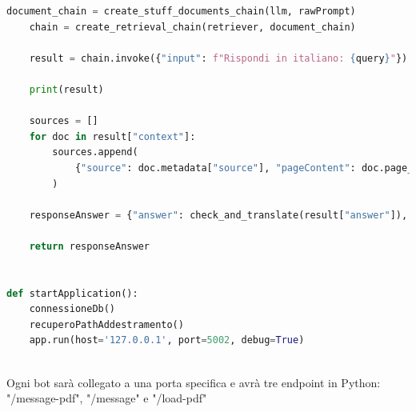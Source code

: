 \documentclass[a4paper,twoside,12pt]{toptesi}
\begin{document}
\begin{lstlisting}[language=Python, caption=Python example]
    document_chain = create_stuff_documents_chain(llm, rawPrompt)
    chain = create_retrieval_chain(retriever, document_chain)

    result = chain.invoke({"input": f"Rispondi in italiano: {query}"})

    print(result)

    sources = []
    for doc in result["context"]:
        sources.append(
            {"source": doc.metadata["source"], "pageContent": doc.page_content}
        )

    responseAnswer = {"answer": check_and_translate(result["answer"]), "sources": sources}

    return responseAnswer


def startApplication():
    connessioneDb()
    recuperoPathAddestramento()
    app.run(host='127.0.0.1', port=5002, debug=True)
        
\end{lstlisting}

Ogni bot sarà collegato a una porta specifica e avrà tre endpoint in Python: "/message-pdf", "/message" e "/load-pdf"



  


\end{document}
